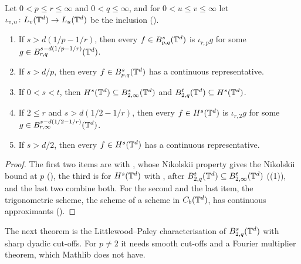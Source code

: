 \begin{theorem}
\label{thm:torus-embeddings}
\leanok
{}
Let $0 < p \leq r \leq \infty$ and $0 < q \leq \infty$, and for $0 < u \leq v \leq \infty$ let
$\iota_{v,u} \colon L_v(\mathbb{T}^d) \to L_u(\mathbb{T}^d)$ be the inclusion ().
\begin{enumerate}
  \item If $s > d(1/p - 1/r)$, then every $f \in B^{s}_{p,q}(\mathbb{T}^d)$ is $\iota_{r,p} g$ for
    some $g \in B^{s - d(1/p - 1/r)}_{r,q}(\mathbb{T}^d)$.
  \item If $s > d/p$, then every $f \in B^{s}_{p,q}(\mathbb{T}^d)$ has a continuous
    representative.
  \item If $0 < s < t$, then $H^s(\mathbb{T}^d) \subseteq B^{s}_{2,\infty}(\mathbb{T}^d)$ and
    $B^{t}_{2,q}(\mathbb{T}^d) \subseteq H^s(\mathbb{T}^d)$.
  \item If $2 \leq r$ and $s > d(1/2 - 1/r)$, then every $f \in H^s(\mathbb{T}^d)$ is
    $\iota_{r,2} g$ for some $g \in B^{s - d(1/2 - 1/r)}_{r,\infty}(\mathbb{T}^d)$.
  \item If $s > d/2$, then every $f \in H^s(\mathbb{T}^d)$ has a continuous representative.
\end{enumerate}
\end{theorem}

\begin{proof}
\leanok
{}
The first two items are  with , whose
Nikolskii property gives the Nikolskii bound at $p$ (), the
third is  for $H^s(\mathbb{T}^d)$ with , after
$B^{t}_{2,q}(\mathbb{T}^d) \subseteq B^{t}_{2,\infty}(\mathbb{T}^d)$
((1)), and the last two combine both. For the second and the last
item, the trigonometric scheme, the scheme of a scheme in $C_b(\mathbb{T}^d)$, has continuous
approximants ().
\end{proof}

The next theorem is the Littlewood--Paley characterisation of $B^{s}_{2,q}(\mathbb{T}^d)$ with
sharp dyadic cut-offs. For $p \neq 2$ it needs smooth cut-offs and a Fourier multiplier
theorem, which Mathlib does not have.


